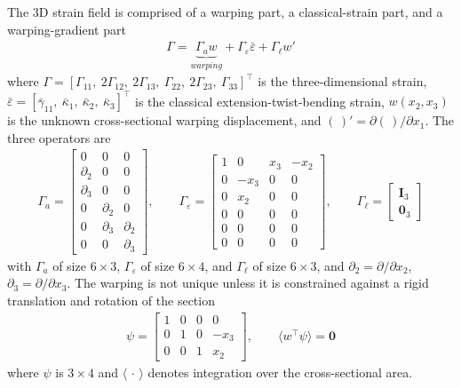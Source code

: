 \documentclass[10pt]{article}
\newcommand{\mbf}[1]{\mathbf{#1}}
\newcommand{\beq}{\begin{equation}\begin{aligned}}
\newcommand{\eeq}{\end{aligned}\end{equation}}
\begin{document}
The 3D strain field is comprised of a warping part, a classical-strain part, and a warping-gradient part \citep[Eqs.~(3.94)--(3.99)]{Hodges2006}
\beq
\label{eqn:VAM3DStrain}
\Gamma = 
\underbrace{\Gamma_a w}_{warping} + \Gamma_\varepsilon \bar\varepsilon + \Gamma_\ell w'
\eeq
where $\Gamma = [\Gamma_{11},\ 2\Gamma_{12},\ 2\Gamma_{13},\ \Gamma_{22},\ 2\Gamma_{23},\ \Gamma_{33}]^\top$ is the three-dimensional strain, $\bar\varepsilon = [\bar\gamma_{11},\ \bar\kappa_1,\ \bar\kappa_2,\ \bar\kappa_3]^\top$ is the classical extension-twist-bending strain, $w(x_2,x_3)$ is the unknown cross-sectional warping displacement, and $(\,)' = \partial(\,)/\partial x_1$.
The three operators are
\beq
\Gamma_a =
\begin{bmatrix}
0 & 0 & 0 \\
\partial_2 & 0 & 0 \\
\partial_3 & 0 & 0 \\
0 & \partial_2 & 0 \\
0 & \partial_3 & \partial_2 \\
0 & 0 & \partial_3
\end{bmatrix}
,\qquad
\Gamma_\varepsilon =
\begin{bmatrix}
1 & 0 & x_3 & -x_2 \\
0 & -x_3 & 0 & 0 \\
0 & x_2 & 0 & 0 \\
0 & 0 & 0 & 0 \\
0 & 0 & 0 & 0 \\
0 & 0 & 0 & 0
\end{bmatrix}
,\qquad
\Gamma_\ell =
\begin{bmatrix}
\mbf{I}_3 \\ \mbf{0}_3
\end{bmatrix}
\label{eqn:VAMGammaOperators}
\eeq
with $\Gamma_a$ of size $6\times3$, $\Gamma_\varepsilon$ of size $6\times4$, and $\Gamma_\ell$ of size $6\times3$, and $\partial_2 = \partial/\partial x_2$, $\partial_3 = \partial/\partial x_3$.
The warping is not unique unless it is constrained against a rigid translation and rotation of the section \citep[Eqs.~(3.102)--(3.104)]{Hodges2006}
\beq
\psi =
\begin{bmatrix}
1 & 0 & 0 & 0 \\
0 & 1 & 0 & -x_3 \\
0 & 0 & 1 & x_2
\end{bmatrix}
,\qquad
\langle w^\top \psi \rangle = \mbf{0}
\label{eqn:VAMWarpingConstraint}
\eeq
where $\psi$ is $3\times4$ and $\langle\,\cdot\,\rangle$ denotes integration over the cross-sectional area.
\end{document}
